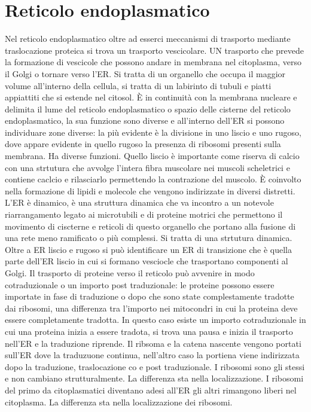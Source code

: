 \section{Reticolo endoplasmatico}
Nel reticolo endoplasmatico oltre ad esserci meccanismi di trasporto mediante traslocazione proteica si trova un trasporto vescicolare. UN trasporto che prevede la formazione di vescicole
che possono andare in membrana nel citoplasma, verso il Golgi o tornare verso l'ER. Si tratta di un organello che occupa il maggior volume all'interno della cellula, si tratta di un
labirinto di tubuli e piatti appiattiti che si estende nel citosol. \`E in continuit\`a con la membrana nucleare e delimita il lume del reticolo endoplasmatico o spazio delle cisterne del
reticolo endoplasmatico, la sua funzione sono diverse e all'interno dell'ER si possono individuare zone diverse: la pi\`u evidente \`e la divisione in uno liscio e uno rugoso, dove
appare evidente in quello rugoso la presenza di ribosomi presenti sulla membrana. Ha diverse funzioni. Quello liscio \`e importante come riserva di calcio con una strtutura che avvolge 
l'intera fibra muscolare nei muscoli scheletrici e contiene caclcio e rilasciarlo permettendo la contrazione del muscolo. \`E coinvolto nella formazione di lipidi e molecole che vengono
indirizzate in diversi distretti. L'ER \`e dinamico, \`e una struttura dinamica che va incontro a un notevole riarrangamento legato ai microtubili e di proteine motrici che permettono 
il movimento di ciscterne e reticoli di questo organello che portano alla fusione di una rete meno ramificato o pi\`u complessi. Si tratta di una strtutura dinamica. Oltre a ER liscio
e rugoso si pu\`o identificare un ER di transizione che \`e quella parte dell'ER liscio in cui si formano vesciocle che trasportano componenti al Golgi. Il trasporto di proteine 
verso il reticolo pu\`o avvenire in modo cotraduzionale o un importo post traduzionale: le proteine possono essere importate in fase di traduzione o dopo che sono state complestamente
tradotte dai ribosomi, una differenza tra l'importo nei mitocondri in cui la proteina deve essere completamente tradotta. In questo caso esiste un importo cotraduzionale in cui una 
proteina inizia a essere tradota, si trova una pausa e inizia il trasporto nell'ER e la traduzione riprende. Il ribsoma e la catena nascente vengono portati sull'ER dove la traduzuone
continua, nell'altro caso la portiena viene indirizzata dopo la traduzione, traslocazione co e post traduzionale. I ribosomi sono gli stessi e non cambiano strutturalmente. La differenza
sta nella localizzazione. I ribosomi del primo da citoplasmatici diventano adesi all'ER gli altri rimangono liberi nel citoplasma. La differenza sta nella localizzazione dei ribosomi. 
